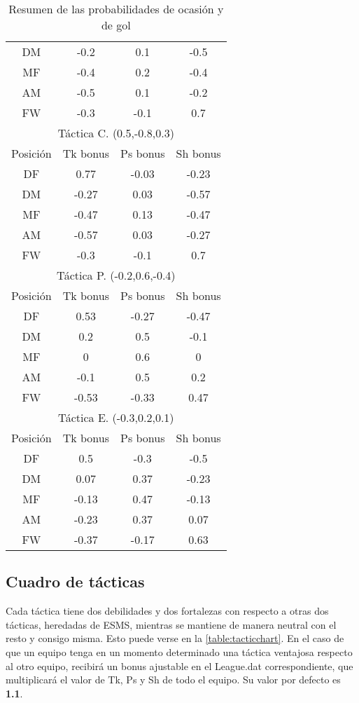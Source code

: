 \documentclass[a4paper,9pt]{article}
\begin{document}
\begin{table}
\begin{center}
\begin{tabular}{c c c c}
      DM & -0.2 & 0.1 & -0.5 \\
      MF & -0.4 & 0.2 & -0.4 \\
      AM & -0.5 & 0.1 & -0.2 \\
      FW & -0.3 & -0.1 & 0.7 \\
      \hline\hline
      \multicolumn{4}{c}{Táctica C. (0.5,-0.8,0.3)}\\
      \hline
      Posición & Tk bonus & Ps bonus & Sh bonus\\
      \hline
      DF & 0.77 & -0.03 & -0.23 \\
      DM & -0.27 & 0.03 & -0.57 \\
      MF & -0.47 & 0.13 & -0.47 \\
      AM & -0.57 & 0.03 & -0.27 \\
      FW & -0.3 & -0.1 & 0.7 \\
      \hline\hline
      \multicolumn{4}{c}{Táctica P. (-0.2,0.6,-0.4)}\\
      \hline
      Posición & Tk bonus & Ps bonus & Sh bonus\\
      \hline
      DF & 0.53 & -0.27 & -0.47 \\
      DM & 0.2 & 0.5 & -0.1 \\
      MF & 0 & 0.6 & 0 \\
      AM & -0.1 & 0.5 & 0.2 \\
      FW & -0.53 & -0.33 & 0.47 \\
      \hline\hline
      \multicolumn{4}{c}{Táctica E. (-0.3,0.2,0.1)}\\
      \hline
      Posición & Tk bonus & Ps bonus & Sh bonus\\
      \hline
      DF & 0.5 & -0.3 & -0.5 \\
      DM & 0.07 & 0.37 & -0.23 \\
      MF & -0.13 & 0.47 & -0.13 \\
      AM & -0.23 & 0.37 & 0.07 \\
      FW & -0.37 & -0.17 & 0.63 \\
      \hline\hline
    \end{tabular}
  \end{center}
  \caption{Resumen de las probabilidades de ocasión y de gol}
  \label{table:tacticbonus}
\end{table}

\subsection{Cuadro de tácticas}\label{sec:CuadroTacticas}
\def \Cverde {\cellcolor{green}}
\def \Crojo {\cellcolor{red}}
\def \Cgris {\cellcolor[rgb]{0.8,0.8,0.8}}
\def \Cblanco {\cellcolor{white}}
Cada táctica tiene dos debilidades y dos fortalezas con respecto a otras dos tácticas, heredadas de ESMS, mientras se mantiene de manera neutral con el resto y consigo misma. Esto puede verse en la \autoref{table:tacticchart}. En el caso de que un equipo tenga en un momento determinado una táctica ventajosa respecto al otro equipo, recibirá un bonus ajustable en el League.dat correspondiente, que multiplicará el valor de Tk, Ps y Sh de todo el equipo. Su valor por defecto es \textbf{1.1}.
\end{document}
